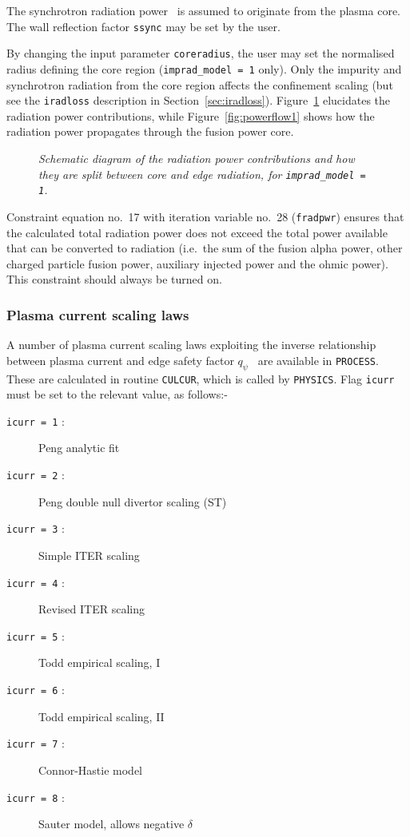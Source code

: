 \documentclass[11pt,a4paper]{report}
\newcommand{\process}{\mbox{\texttt{PROCESS}}}
\begin{document}
The synchrotron radiation power~\cite{albajar, fidone} is assumed to originate
from the plasma core. The wall reflection factor \texttt{ssync} may be set by
the user.

By changing the input parameter \texttt{coreradius}, the user may set the
normalised radius defining the core region (\texttt{imprad\_model = 1}
only). Only the impurity and synchrotron radiation from the core region
affects the confinement scaling (but see the \texttt{iradloss} description in
Section~\ref{sec:iradloss}). Figure~\ref{fig:radiation} elucidates the
radiation power contributions, while Figure~\ref{fig:powerflow1} shows how the radiation power propagates through the fusion power core.

\begin{figure}[tbph]
\caption[Radiation power contributions] {\label{fig:radiation}
  \textit{Schematic diagram of the radiation power contributions and how they
    are split between core and edge radiation, for \texttt{imprad\_model = 1}.} }
\end{figure}

Constraint equation no.~17 with iteration variable no.~28 (\texttt{fradpwr})
ensures that the calculated total radiation power does not exceed the total
power available that can be converted to radiation (i.e.\ the sum of the fusion
alpha power, other charged particle fusion power, auxiliary injected power and
the ohmic power). This constraint should always be turned on.

\subsubsection{Plasma current scaling laws}
\label{sec:current_scaling}

A number of plasma current scaling laws exploiting the inverse relationship
between plasma current and edge safety factor $q_{\psi}$~\cite{172} are
available in \process. These are calculated in routine \texttt{CULCUR}, which
is called by \texttt{PHYSICS}.  Flag \texttt{icurr} must be set to the
relevant value, as follows:-
\begin{description}
\item [\texttt{icurr = 1} :] Peng analytic fit
\item [\texttt{icurr = 2} :] Peng double null divertor scaling (ST)~\cite{storac}
\item [\texttt{icurr = 3} :] Simple ITER scaling
\item [\texttt{icurr = 4} :] Revised ITER scaling~\cite{Uckan88}
\item [\texttt{icurr = 5} :] Todd empirical scaling, I
\item [\texttt{icurr = 6} :] Todd empirical scaling, II
\item [\texttt{icurr = 7} :] Connor-Hastie model
\item [\texttt{icurr = 8} :] Sauter model, allows negative $\delta$
\end{description}
\end{document}
